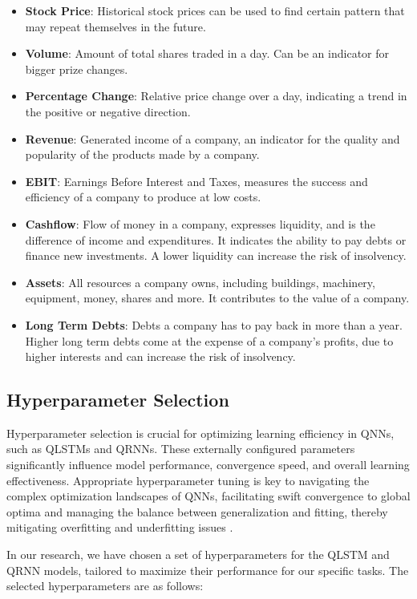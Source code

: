 \begin{itemize}
    \item \textbf{Stock Price}: Historical stock prices can be used to find certain pattern that may repeat themselves in the future.
    \item \textbf{Volume}: Amount of total shares traded in a day. Can be an indicator for bigger prize changes.
    \item \textbf{Percentage Change}: Relative price change over a day, indicating a trend in the positive or negative direction.
    \item \textbf{Revenue}: Generated income of a company, an indicator for the quality and popularity of the products made by a company.
    \item \textbf{EBIT}: Earnings Before Interest and Taxes, measures the success and efficiency of a company to produce at low costs. 
    \item \textbf{Cashflow}: Flow of money in a company, expresses liquidity, and is the difference of income and expenditures. It indicates the ability to pay debts or finance new investments. A lower liquidity can increase the risk of insolvency.
    \item \textbf{Assets}: All resources a company owns, including buildings, machinery, equipment, money, shares and more. It contributes to the value of a company.
    \item \textbf{Long Term Debts}: Debts a company has to pay back in more than a year. Higher long term debts come at the expense of a company's profits, due to higher interests and can increase the risk of insolvency.
\end{itemize}

\subsection{Hyperparameter Selection}
Hyperparameter selection is crucial for optimizing learning efficiency in QNNs, such as QLSTMs and QRNNs. These externally configured parameters significantly influence model performance, convergence speed, and overall learning effectiveness. Appropriate hyperparameter tuning is key to navigating the complex optimization landscapes of QNNs, facilitating swift convergence to global optima and managing the balance between generalization and fitting, thereby mitigating overfitting and underfitting issues \cite{jin2022hyperparameter}.


In our research, we have chosen a set of hyperparameters for the QLSTM and QRNN models, tailored to maximize their performance for our specific tasks. The selected hyperparameters are as follows:


